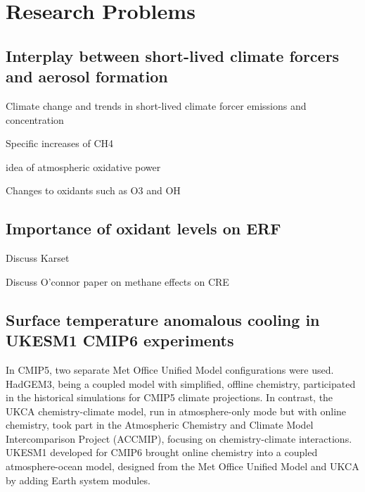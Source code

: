 \section{Research Problems}

\subsection{Interplay between short-lived climate forcers and aerosol formation}

Climate change and trends in short-lived climate forcer emissions and concentration

Specific increases of CH4 

idea of atmospheric oxidative power

Changes to oxidants such as O3 and OH


\subsection{Importance of oxidant levels on ERF}
Discuss Karset


Discuss O'connor paper on methane effects on CRE


\subsection{Surface temperature anomalous cooling in UKESM1 CMIP6 experiments}

In CMIP5, two separate Met Office Unified Model configurations were used. HadGEM3, being a coupled model with simplified, offline chemistry, participated in the historical simulations for CMIP5 climate projections. In contrast, the UKCA chemistry-climate model, run in atmosphere-only mode but with online chemistry, took part in the Atmospheric Chemistry and Climate Model Intercomparison Project (ACCMIP), focusing on chemistry-climate interactions. UKESM1 developed for CMIP6 brought online chemistry into a coupled atmosphere-ocean model, designed from the Met Office Unified Model and UKCA by adding Earth system modules.

